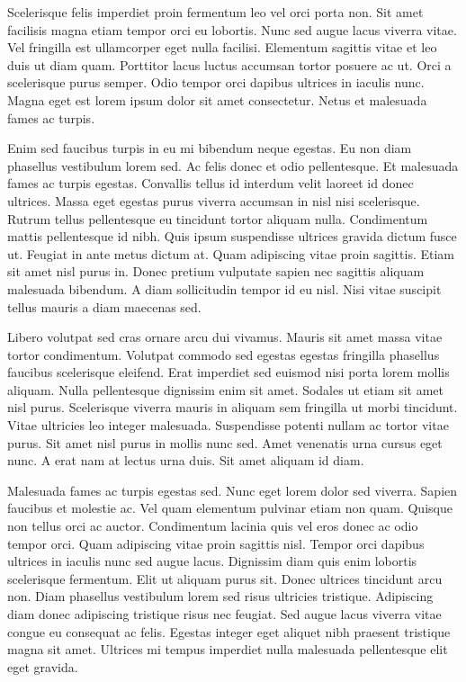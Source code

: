 \documentclass[]{tufte-handout}
\begin{document}
Scelerisque felis imperdiet proin fermentum leo vel orci porta non. Sit
amet facilisis magna etiam tempor orci eu lobortis. Nunc sed augue lacus
viverra vitae. Vel fringilla est ullamcorper eget nulla facilisi.
Elementum sagittis vitae et leo duis ut diam quam. Porttitor lacus
luctus accumsan tortor posuere ac ut. Orci a scelerisque purus semper.
Odio tempor orci dapibus ultrices in iaculis nunc. Magna eget est lorem
ipsum dolor sit amet consectetur. Netus et malesuada fames ac turpis.


Enim sed faucibus turpis in eu mi bibendum neque egestas. Eu non diam
phasellus vestibulum lorem sed. Ac felis donec et odio pellentesque. Et
malesuada fames ac turpis egestas. Convallis tellus id interdum velit
laoreet id donec ultrices. Massa eget egestas purus viverra accumsan in
nisl nisi scelerisque. Rutrum tellus pellentesque eu tincidunt tortor
aliquam nulla. Condimentum mattis pellentesque id nibh. Quis ipsum
suspendisse ultrices gravida dictum fusce ut. Feugiat in ante metus
dictum at. Quam adipiscing vitae proin sagittis. Etiam sit amet nisl
purus in. Donec pretium vulputate sapien nec sagittis aliquam malesuada
bibendum. A diam sollicitudin tempor id eu nisl. Nisi vitae suscipit
tellus mauris a diam maecenas sed.

Libero volutpat sed cras ornare arcu dui vivamus. Mauris sit amet massa
vitae tortor condimentum. Volutpat commodo sed egestas egestas fringilla
phasellus faucibus scelerisque eleifend. Erat imperdiet sed euismod nisi
porta lorem mollis aliquam. Nulla pellentesque dignissim enim sit amet.
Sodales ut etiam sit amet nisl purus. Scelerisque viverra mauris in
aliquam sem fringilla ut morbi tincidunt. Vitae ultricies leo integer
malesuada. Suspendisse potenti nullam ac tortor vitae purus. Sit amet
nisl purus in mollis nunc sed. Amet venenatis urna cursus eget nunc. A
erat nam at lectus urna duis. Sit amet aliquam id diam.

Malesuada fames ac turpis egestas sed. Nunc eget lorem dolor sed
viverra. Sapien faucibus et molestie ac. Vel quam elementum pulvinar
etiam non quam. Quisque non tellus orci ac auctor. Condimentum lacinia
quis vel eros donec ac odio tempor orci. Quam adipiscing vitae proin
sagittis nisl. Tempor orci dapibus ultrices in iaculis nunc sed augue
lacus. Dignissim diam quis enim lobortis scelerisque fermentum. Elit ut
aliquam purus sit. Donec ultrices tincidunt arcu non. Diam phasellus
vestibulum lorem sed risus ultricies tristique. Adipiscing diam donec
adipiscing tristique risus nec feugiat. Sed augue lacus viverra vitae
congue eu consequat ac felis. Egestas integer eget aliquet nibh praesent
tristique magna sit amet. Ultrices mi tempus imperdiet nulla malesuada
pellentesque elit eget gravida.
\end{document}
